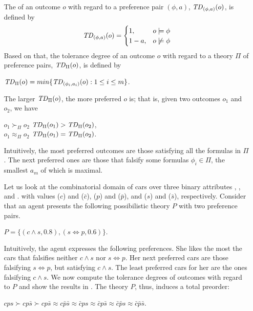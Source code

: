 The  of an outcome $o$ with regard to a preference 
pair $(\phi,a)$, $\mathit{TD}_{(\phi,a)}(o)$, is defined by
\[
 \mathit{TD}_{(\phi,a)}(o) =
  \begin{cases}
   1, & o \models \phi \\
   1-a, & o \not \models \phi
  \end{cases}
\]
Based on that, the tolerance degree of an outcome $o$ with regard to a
theory $\Pi$ of preference pairs, $\mathit{TD}_\Pi(o)$, is defined by 
\begin{center}
	$\mathit{TD}_\Pi(o)=min\{\mathit{TD}_{(\phi_i,a_i)}(o):1\leq i \leq m\}$.
\end{center}
The larger $\mathit{TD}_\Pi(o)$, the more preferred $o$ is; that is, 
given two outcomes $o_1$ and $o_2$, we have
\begin{center}
	$o_1 \succ_\Pi o_2$ \itiff $\mathit{TD}_\Pi(o_1) > \mathit{TD}_\Pi(o_2)$,\\
	$o_1 \approx_\Pi o_2$ \itiff $\mathit{TD}_\Pi(o_1) = \mathit{TD}_\Pi(o_2)$.
\end{center}
Intuitively, the most preferred outcomes are those satisfying
all the formulas in $\Pi$.
The next preferred ones are those that falsify some
formulas $\phi_i \in \Pi$, the smallest $a_m$ of which
is maximal.

Let us look at the combinatorial domain of cars 
over three binary attributes
, , and .
with values  ($c$) and  ($\bar{c}$),
 ($p$) and  ($\bar{p}$), and
 ($s$) and  ($\bar{s}$), respectively.
Consider that an agent presents the following possibilistic 
theory $P$ with two preference pairs.
\begin{center}
	$P = \{ (c\land s,0.8), (s \Leftrightarrow p,0.6) \}$.
\end{center}
Intuitively, the agent expresses the following preferences.
She likes the most the cars that falsifies neither $c\land s$
nor $s \Leftrightarrow p$.
Her next preferred cars are those falsifying $s \Leftrightarrow p$,
but satisfying $c\land s$.
The least preferred cars for her are the ones falsifying
$c\land s$.
We now compute the tolerance degrees of outcomes with regard to $P$
and show the results in .
The theory $P$, thus, induces a total preorder:
\begin{center}
	$cps \succ cp\bar{s} \succ cp\bar{s} \approx c\bar{p}\bar{s} \approx 
		\bar{c} ps \approx \bar{c} p\bar{s} \approx \bar{c} \bar{p} s \approx \bar{c} \bar{p} \bar{s}$.
\end{center}

